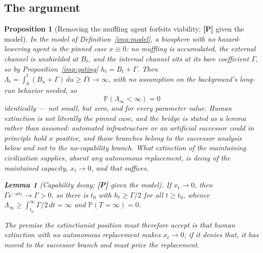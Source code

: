 \documentclass[11pt]{article}
\newcommand{\PP}{\mathbb{P}}
\theoremstyle{plain}
\newtheorem{proposition}[theorem]{Proposition}
\newtheorem{lemma}[theorem]{Lemma}
\theoremstyle{definition}
\theoremstyle{remark}
\begin{document}
\subsection{The argument}\label{hr:subsub:extinctionargument}

\begin{proposition}[Removing the muffling agent forfeits viability;
\textbf{[P]} given the model]\label{hr:prop:extinction}
In the model of Definition~\ref{imp:model}, a biosphere with no hazard-lowering
agent is the pinned case $x\equiv0$: no muffling is accumulated, the
external channel is unshielded at $B_t$, and the internal channel sits
at its bare coefficient $\Gamma$, so by Proposition~\ref{imp:gating}
$h_t=B_t+\Gamma$. Then $\Lambda_t=\int_0^t(B_u+\Gamma)\,du\ge\Gamma t\to\infty$,
with no assumption on the background's long-run behavior needed, so
\[
\PP(\Lambda_\infty<\infty)=0
\]
identically --- not small, but zero, and for every parameter value.
Human extinction is not literally the pinned case, and the bridge is
stated as a lemma rather than assumed: automated infrastructure or an
artificial successor could in principle hold $x$ positive, and those
branches belong to the successor analysis below and not to the
no-capability branch. What extinction of the maintaining civilization
supplies, absent any autonomous replacement, is decay of the maintained
capacity, $x_t\to0$, and that suffices.

\begin{lemma}[Capability decay; \textbf{[P]} given the model]
\label{hr:lem:decay}
If $x_t\to0$, then $\Gamma e^{-\rho x_t}\to\Gamma>0$, so there is $t_0$
with $h_t\ge\Gamma/2$ for all $t\ge t_0$, whence
$\Lambda_\infty\ge\int_{t_0}^\infty\Gamma/2\,dt=\infty$ and $\PP(T=\infty)=0$.
\end{lemma}

\noindent The premise the extinctionist position must therefore
accept is that human extinction with no autonomous replacement makes
$x_t\to0$; if it denies that, it has moved to the successor branch and
must price the replacement.


\end{proposition}
\end{document}

